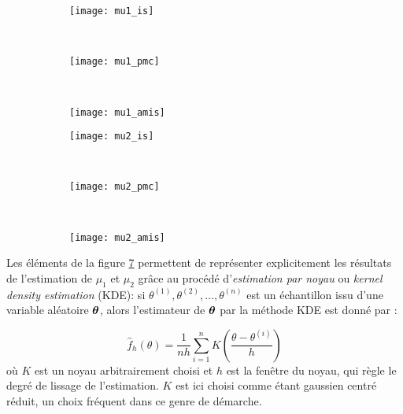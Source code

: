 \begin{figure}[h!]
	\centering
	\begin{subfigure}[t]{0.33\textwidth}
		\centering
		\texttt{[image: mu1\_is]}
		\caption{}
		\label{mu1_is}
	\end{subfigure}%
	~ 
		\begin{subfigure}[t]{0.33\textwidth}
			\centering
			\texttt{[image: mu1\_pmc]}
			\caption{}
			\label{mu1_pmc}
		\end{subfigure}%
		~ 
		\begin{subfigure}[t]{0.33\textwidth}
			\centering
			\texttt{[image: mu1\_amis]}
			\caption{}
			\label{mu1_amis}
		\end{subfigure}

	\begin{subfigure}[t]{0.33\textwidth}
		\centering
		\texttt{[image: mu2\_is]}
		\caption{}
		\label{mu2_is}
	\end{subfigure}%
	~ 
	\begin{subfigure}[t]{0.33\textwidth}
		\centering
		\texttt{[image: mu2\_pmc]}
		\caption{}
		\label{mu2_pmc}
	\end{subfigure}%
	~ 
	\begin{subfigure}[t]{0.33\textwidth}
		\centering
		\texttt{[image: mu2\_amis]}
		\caption{}
		\label{mu2_amis}
	\end{subfigure}
	\caption{}
	\label{fig_mus}
\end{figure}

Les éléments de la figure \ref{fig_mus} permettent de représenter explicitement les résultats de l'estimation de $\mu_1$ et $\mu_2$ grâce au procédé d'\textit{estimation par noyau} ou \textit{kernel density estimation} (KDE): si $\theta^{(1)}, \theta^{(2)}, \dots, \theta^{(n)}$ est un échantillon issu d'une variable aléatoire ${\bm{\theta}}$, alors l'estimateur de ${\bm{\theta}}$ par la méthode KDE est donné par :

 \begin{equation}
	\widehat{f}_h(\theta) = \dfrac{1}{nh}\sum\limits_{i=1}^n K\left(\dfrac{\theta - \theta^{(i)}}{h}\right)
	\label{eq_KDE} 
 \end{equation} 
 où $K$ est un noyau arbitrairement choisi et $h$ est la fenêtre du noyau, qui règle le degré de lissage de l'estimation. $K$ est ici choisi comme étant gaussien centré réduit, un choix fréquent dans ce genre de démarche. \\
 
